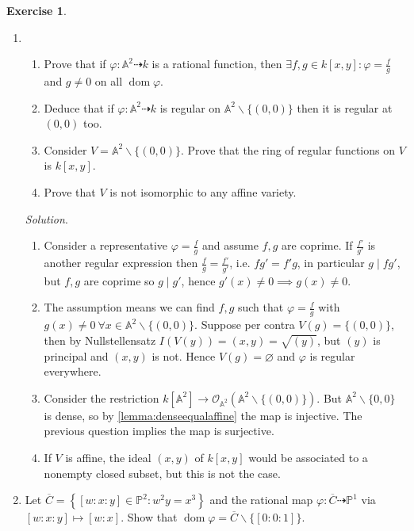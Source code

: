 \documentclass{article}
\newcommand{\A}{\mathbb{A}}
\newcommand{\p}{\mathbb{P}}
\newcommand{\dom}{\operatorname{dom}}
\theoremstyle{definition}
\newtheorem{exe}[defn]{Exercise}
\newtheorem{remark}[defn]{Remark}
\begin{document}
\begin{exe}
\begin{enumerate}
\begin{enumerate}
\begin{remark}
There are indeed nonregular rational maps from, for example, $\p^2$, e.g. $\psi:\p^2\dashrightarrow\p^2:[x:y:z]\mapsto [yz:zx:xy]$ is not regular at $[1:0:0],[0:1:0]$ and $[0:0:1]$.
\end{remark}
\end{enumerate}
\item \begin{enumerate}
\item Prove that if $\varphi:\A^2\dashrightarrow k$ is a rational function, then $\exists f,g\in k[x,y]:\varphi=\frac{f}{g}$ and $g\neq 0$ on all $\dom\varphi$.
\item Deduce that if $\varphi:\A^2\dashrightarrow k$ is regular on $\A^2\backslash\{(0,0)\}$ then it is regular at $(0,0)$ too.
\item Consider $V=\A^2\backslash\{(0,0)\}$. Prove that the ring of regular functions on $V$ is $k[x,y]$.
\item Prove that $V$ is not isomorphic to any affine variety.
\end{enumerate}
\textit{Solution}. \begin{enumerate}
\item Consider a representative $\varphi=\frac{f}{g}$ and assume $f,g$ are coprime. If $\frac{f'}{g'}$ is another regular expression then $\frac{f}{g}=\frac{f'}{g'}$, i.e. $fg'=f'g$, in particular $g\mid fg'$, but $f,g$ are coprime so $g\mid g'$, hence $g'(x)\neq 0\implies g(x)\neq 0$.
\item The assumption means we can find $f,g$ such that $\varphi=\frac{f}{g}$ with $g(x)\neq 0 \ \forall x\in\A^2\backslash\{(0,0)\}$. Suppose per contra $V(g)=\{(0,0)\}$, then by Nullstellensatz $I(V(y))=(x,y)=\sqrt{(y)}$, but $(y)$ is principal and $(x,y)$ is not. Hence $V(g)=\varnothing$ and $\varphi$ is regular everywhere.
\item Consider the restriction $k[\A^2]\rightarrow\mathcal O_{\A^2}(\A^2\backslash\{(0,0)\})$. But $\A^2\backslash\{0,0\}$ is dense, so by \ref{lemma:denseequalaffine} the map is injective. The previous question implies the map is surjective.
\item If $V$ is affine, the ideal $(x,y)$ of $k[x,y]$ would be associated to a nonempty closed subset, but this is not the case.
\end{enumerate}
\item Let $\overline C=\left\{[w:x:y]\in\p^2:w^2y=x^3\right\}$ and the rational map $\varphi:\overline C\dashrightarrow\p^1$ via $[w:x:y]\mapsto [w:x]$. Show that $\dom\varphi=\overline C\backslash\{[0:0:1]\}$.


\end{enumerate}
\end{exe}
\end{document}
